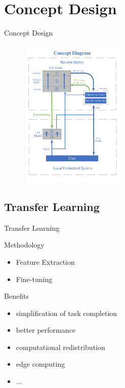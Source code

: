 \documentclass[12pt]{beamer}
\begin{document}
\section{Concept Design}
\begin{frame}{Concept Design}
\begin{figure}[H]
    \centering
    \includegraphics[width=0.45\textwidth]{Concept_Design.pdf}
\end{figure}
\end{frame}



\subsection{Transfer Learning}
\begin{frame}{Transfer Learning}
    \begin{block}{Methodology}
        \begin{itemize}
            \item Feature Extraction
            \item Fine-tuning
        \end{itemize}
    \end{block}
    
    \begin{block}{Benefits}
        \begin{itemize}
            \item simplification of task completion
            \item better performance
            \item computational redistribution
            \item edge computing
            \item ...
        \end{itemize}
    \end{block}
\end{frame}
\end{document}
